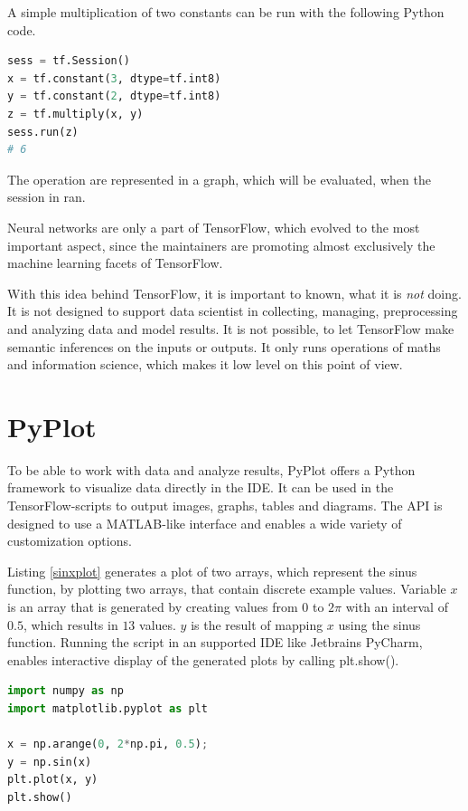 \documentclass[11pt]{article}
\begin{document}
A simple multiplication of two constants can be run with the following Python code.

\begin{lstlisting}[caption={Multiplying two constants in Tensorflow}, language=Python]
sess = tf.Session()
x = tf.constant(3, dtype=tf.int8)
y = tf.constant(2, dtype=tf.int8)
z = tf.multiply(x, y)
sess.run(z)
# 6
\end{lstlisting}

The operation are represented in a graph, which will be evaluated, when the session in ran.

Neural networks are only a part of TensorFlow, which evolved to the most important aspect, since the maintainers are promoting almost exclusively the machine learning facets of TensorFlow.

With this idea behind TensorFlow, it is important to known, what it is \textit{not} doing.
It is not designed to support data scientist in collecting, managing, preprocessing and analyzing data and model results.
It is not possible, to let TensorFlow make semantic inferences on the inputs or outputs.
It only runs operations of maths and information science, which makes it low level on this point of view.

\section{PyPlot}

To be able to work with data and analyze results, PyPlot offers a Python framework to visualize data directly in the IDE.
It can be used in the TensorFlow-scripts to output images, graphs, tables and diagrams.
The API is designed to use a MATLAB-like interface and enables a wide variety of customization options.

Listing \ref{sinxplot} generates a plot of two arrays, which represent the sinus function, by plotting two arrays, that contain discrete example values.
Variable $x$ is an array that is generated by creating values from $0$ to $2\pi$ with an interval of $0.5$, which results in $13$ values.
$y$ is the result of mapping $x$ using the sinus function.
Running the script in an supported IDE like Jetbrains PyCharm, enables interactive display of the generated plots by calling plt.show().

\begin{lstlisting}[caption={Generating a plot of sin(x) with some discrete values.)}, language=Python, label=sinxplot]
import numpy as np
import matplotlib.pyplot as plt

x = np.arange(0, 2*np.pi, 0.5);
y = np.sin(x)
plt.plot(x, y)
plt.show()
\end{lstlisting}
\end{document}
